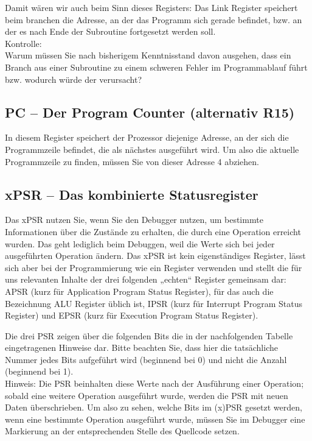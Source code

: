 Damit wären wir auch beim Sinn dieses Registers: Das Link Register speichert beim branchen die Adresse, an der das Programm sich gerade befindet, bzw. an der es nach Ende der Subroutine fortgesetzt werden soll. \\

Kontrolle:\\

Warum müssen Sie nach bisherigem Kenntnisstand davon ausgehen, dass ein Branch aus einer Subroutine zu einem schweren Fehler im Programmablauf führt bzw. wodurch würde der verursacht?   
  
\subsection{PC – Der Program Counter (alternativ R15)}

In diesem Register speichert der Prozessor diejenige Adresse, an der sich die Programmzeile befindet, die als nächstes ausgeführt wird. Um also die aktuelle Programmzeile zu finden, müssen Sie von dieser Adresse 4 abziehen.

\subsection{xPSR – Das kombinierte Statusregister}

Das xPSR nutzen Sie, wenn Sie den Debugger nutzen, um bestimmte Informationen über die Zustände zu erhalten, die durch eine Operation erreicht wurden. Das geht lediglich beim Debuggen, weil die Werte sich bei jeder ausgeführten Operation ändern. Das xPSR ist kein eigenständiges Register, lässt sich aber bei der Programmierung wie ein Register verwenden und stellt die für uns relevanten Inhalte der drei folgenden „echten“ Register gemeinsam dar: \\

APSR (kurz für Application Program Status Register), für das auch die Bezeichnung ALU Register üblich ist, 
IPSR (kurz für Interrupt Program Status Register) und 
EPSR (kurz für Execution Program Status Register). 

Die drei PSR zeigen über die folgenden Bits die in der nachfolgenden Tabelle eingetragenen Hinweise dar. Bitte beachten Sie, dass hier die tatsächliche Nummer jedes Bits aufgeführt wird (beginnend bei 0) und nicht die Anzahl (beginnend bei 1).\\

Hinweis: Die PSR beinhalten diese Werte nach der Ausführung einer Operation; sobald eine weitere Operation ausgeführt wurde, werden die PSR mit neuen Daten überschrieben. Um also zu sehen, welche Bits im (x)PSR gesetzt werden, wenn eine bestimmte Operation ausgeführt wurde, müssen Sie im Debugger eine Markierung an der entsprechenden Stelle des Quellcode setzen.\\

